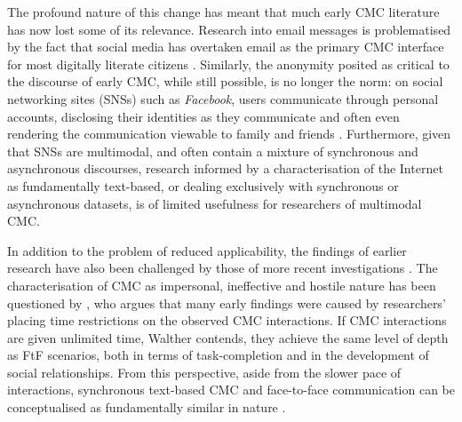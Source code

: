 				The profound nature of this change has meant that much early CMC literature has now lost some of its relevance. Research into email messages is problematised by the fact that social media has overtaken email as the primary CMC interface for most digitally literate citizens \cite{thorne_computer-mediated_2008}. Similarly, the anonymity posited as critical to the discourse of early CMC, while still possible, is no longer the norm: on social networking sites (SNSs) such as \emph{Facebook}, users communicate through personal accounts, disclosing their identities as they communicate and often even rendering the communication viewable to family and friends \cite{boyd_social_2007}. Furthermore, given that SNSs are multimodal, and often contain a mixture of synchronous and asynchronous discourses, research informed by a characterisation of the Internet as fundamentally text-based, or dealing exclusively with synchronous or asynchronous datasets, is of limited usefulness for researchers of multimodal CMC. 

				In addition to the problem of reduced applicability, the findings of earlier research have also been challenged by those of more recent investigations \cite{herring_computer-mediated_2001,postmes_formation_2000}. The characterisation of CMC as impersonal, ineffective and hostile nature has been questioned by \textcite{walther_computer-mediated_1996}, who argues that many early findings were caused by researchers’ placing time restrictions on the observed CMC interactions. If CMC interactions are given unlimited time, Walther contends, they achieve the same level of depth as FtF scenarios, both in terms of task-completion and in the development of social relationships. From this perspective, aside from the slower pace of interactions, synchronous text-based CMC and face-to-face communication can be conceptualised as fundamentally similar in nature \cite{walther_interpersonal_1994,osullivan_reconceptualizing_2003,wu_is_2013}.

